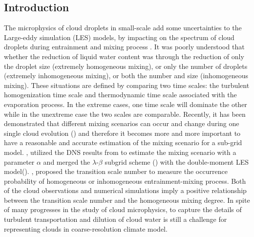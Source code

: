 \documentclass[draft,jgrga]{AGUTeX}
\begin{document}
\begin{article}

\section{Introduction}

The microphysics of cloud droplets in small-scale add some uncertainties to the Large-eddy simulation (LES) models, by impacting on the spectrum of cloud droplets during entrainment and mixing process  \cite{Jarecka2013}. It was poorly understood that whether the reduction of liquid water content was through the reduction of only the droplet size (extremely homogeneous mixing), or only the number of droplets (extremely inhomogeneous mixing), or both the number and size (inhomogeneous mixing). These situations are defined by comparing two time scales: the turbulent homogenization time scale and thermodynamic time scale associated with the evaporation process. In the extreme cases, one time scale will dominate the other while in the unextreme case the two scales are comparable. Recently, it has been demonstrated that different mixing scenarios can occur and change during one single cloud evolution (\cite{And09,Burnet07,Lehmann09}) and therefore it becomes more and more important to have a reasonable and accurate estimation of the mixing scenario for a sub-grid model. \cite{Jarecka2013}, utilized the DNS results from \cite{And04,And06,And09}  to estimate the mixing scenario with a parameter $\alpha$ and merged the $\lambda$-$\beta$ subgrid scheme (\cite{Jarecka2009}) with the double-moment LES model(\cite{Morrison2008}). \cite{Lu2013}, proposed the transition scale number to measure the occurrence probability of homogeneous or inhomogeneous entrainment-mixing process. Both of the cloud observations and numerical simulations imply a positive relationship between the transition scale number and the homogeneous mixing degree. In spite of many progresses in the study of cloud microphysics, to capture the details of turbulent transportation and dilution of cloud water is still a challenge for representing clouds in coarse-resolution climate model.
   

\end{article}
\end{document}
